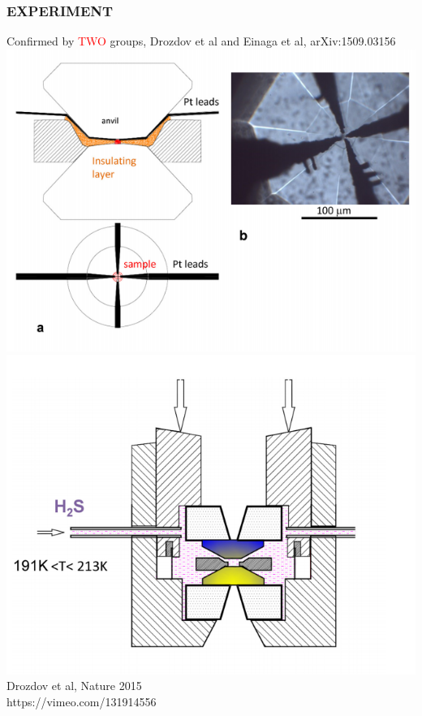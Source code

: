 \documentclass[amssymb,amsmath]{beamer}
\newcommand{\red}{\textcolor{red}}
\begin{document}
\begin{frame}
\frametitle{EXPERIMENT}
Confirmed by \red{TWO} groups, Drozdov et al and Einaga et al, arXiv:1509.03156 \\
\includegraphics[scale=0.25]{./figures/diamond_anvil.png} 
\includegraphics[scale=0.25]{./figures/diamond_anvil_fill.png} \\
Drozdov et al, Nature 2015 \\
https://vimeo.com/131914556
\end{frame}
\end{document}
